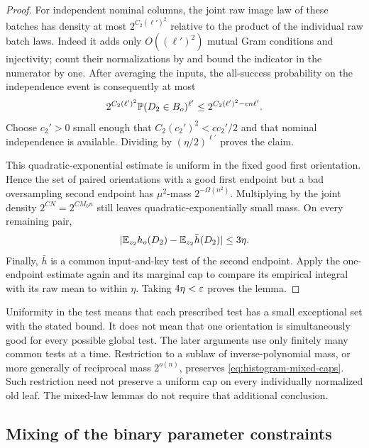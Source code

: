 \begin{proof}
For independent nominal columns, the joint raw image law of these
batches has density at most $2^{C_2(\ell')^2}$ relative to the product
of the individual raw batch laws. Indeed it adds only
$O((\ell')^2)$ mutual Gram conditions and injectivity; count their
normalizations by  and bound the
indicator in the numerator by one. After averaging the inputs, the
all-success probability on the independence event is consequently at
most
\[
 2^{C_2(\ell')^2}\mathbb P(D_2\in B_o)^{\ell'}
 \le2^{C_2(\ell')^2-cn\ell'}.
\]
Choose $c_2'>0$ small enough that $C_2(c_2')^2<cc_2'/2$ and that
nominal independence is available. Dividing by
$(\eta/2)^{\ell'}$ proves the claim.

This quadratic-exponential estimate is uniform in the fixed good
first orientation. Hence the set of paired orientations with a good
first endpoint but a bad oversampling second endpoint has
$\mu^2$-mass $2^{-\Omega(n^2)}$. Multiplying by the joint density
$2^{CN}=2^{CM_0n}$ still leaves quadratic-exponentially small mass.
On every remaining pair,
\[
 \lvert \mathbb E_{z_2}h_o(D_2)-\mathbb E_{z_2}\bar h(D_2)\rvert\le3\eta.
\]
Finally, $\bar h$ is a common input-and-key test of the second
endpoint. Apply the one-endpoint estimate again and its marginal cap
to compare its empirical integral with its raw mean to within
$\eta$. Taking $4\eta<\varepsilon$ proves the lemma.
\end{proof}

\begin{remark}\label{rem:typicality-no-test-supremum}
Uniformity in the test means that each prescribed test has a small
exceptional set with the stated bound. It does not mean that one
orientation is simultaneously good for every possible global test.
The later arguments use only finitely many common tests at a time.
Restriction to a sublaw of inverse-polynomial mass, or more generally
of reciprocal mass $2^{o(n)}$, preserves
\eqref{eq:histogram-mixed-caps}. Such restriction need not preserve a
uniform cap on every individually normalized old leaf. The mixed-law
lemmas do not require that additional conclusion.
\end{remark}

\subsection{Mixing of the binary parameter constraints}

